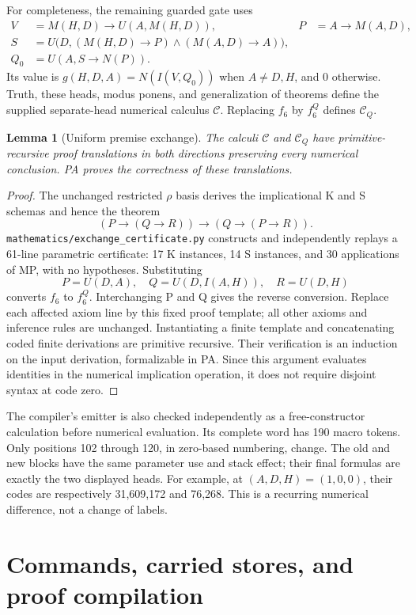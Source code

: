\documentclass[10pt,letterpaper]{article}
\newtheorem{lemma}[theorem]{Lemma}
\newcommand{\file}[1]{\nolinkurl{#1}}
\newcommand{\C}{\mathcal C}
\newcommand{\CQ}{\mathcal C_Q}
\begin{document}
For completeness, the remaining guarded gate uses
\begin{align*}
 V&=M(H,D)\to U(A,M(H,D)), & P&=A\to M(A,D),\\
 S&=U\bigl(D,(M(H,D)\to P)\wedge(M(A,D)\to A)\bigr),\\
 Q_0&=U(A,S\to N(P)).
\end{align*}
Its value is
\(g(H,D,A)=N(I(V,Q_0))\) when \(A\ne D,H\), and 0 otherwise.
Truth, these heads, modus ponens, and generalization of theorems define the
supplied separate-head numerical calculus \(\C\). Replacing \(f_6\) by
\(f_6^Q\) defines \(\CQ\).

\begin{lemma}[Uniform premise exchange]\label{lem:exchange}
The calculi \(\C\) and \(\CQ\) have primitive-recursive proof translations
in both directions preserving every numerical conclusion. PA proves the
correctness of these translations.
\end{lemma}
\begin{proof}
The unchanged restricted \(\rho\) basis derives the implicational K and S
schemas and hence the theorem
\[
 (P\to(Q\to R))\to(Q\to(P\to R)).
\]
\file{mathematics/exchange_certificate.py} constructs and independently
replays a 61-line parametric certificate: 17 K instances, 14 S instances,
and 30 applications of MP, with no hypotheses. Substituting
\[
 P=U(D,A),\quad Q=U(D,I(A,H)),\quad R=U(D,H)
\]
converts \(f_6\) to \(f_6^Q\). Interchanging P and Q gives the reverse
conversion. Replace each affected axiom line by this fixed proof template;
all other axioms and inference rules are unchanged. Instantiating a finite
template and concatenating coded finite derivations are primitive recursive.
Their verification is an induction on the input derivation, formalizable in
PA. Since this argument evaluates identities in the numerical implication
operation, it does not require disjoint syntax at code zero.
\end{proof}

The compiler's emitter is also checked independently as a free-constructor
calculation before numerical evaluation. Its complete word has 190 macro
tokens. Only positions 102 through 120, in zero-based numbering, change.
The old and new blocks have the same parameter use and stack effect; their
final formulas are exactly the two displayed heads. For example, at
\((A,D,H)=(1,0,0)\), their codes are respectively 31,609,172 and 76,268.
This is a recurring numerical difference, not a change of labels.

\section{Commands, carried stores, and proof compilation}\label{sec:commands}
\end{document}
